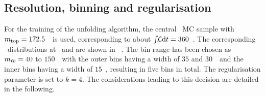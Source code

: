 \subsection{Resolution, binning and regularisation}
For the training of the unfolding algorithm, the central \ttbar\ \gls{MC} sample with $m_{\mathrm{top}}=172.5$~\GeV\ is used, corresponding to about $\int\!\!{\mathcal L}\mathrm{d}t=360$~\invfb. The corresponding \mlb\ distributions at \recol\ and \truelevel are shown in \fig~.
%
The bin range has been chosen as $m_{\ell b}=40$ to $150$~\GeV\ with the outer bins having a width of $35$ and $30$~\GeV\ and the inner bins having a width of $15$~\GeV, resulting in five bins in total. 
%
The regularisation parameter is set to $k=4$.
%
The considerations leading to this decision are detailed in the following.
%
